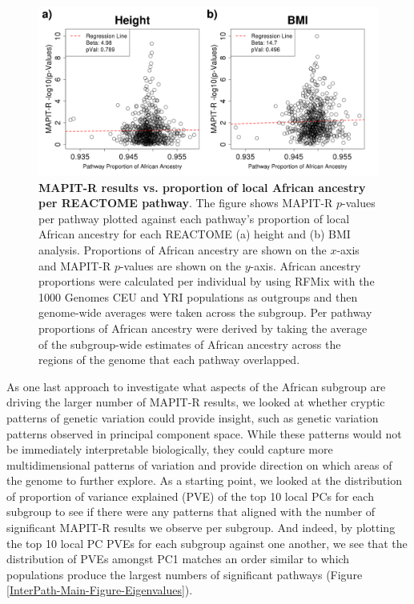 \documentclass[12pt,a4paper]{article}
\begin{document}
\begin{figure}[htb]
\centering
\includegraphics[scale=.35]{Images/Main/InterPath_Main_Figure_RFMix_vs2_African_REACTOME_noHLA.png}
\caption[TBD]{\textbf{MAPIT-R results vs. proportion of local African ancestry per REACTOME pathway}. The figure shows MAPIT-R $p$-values per pathway plotted against each pathway's proportion of local African ancestry for each REACTOME (a) height and (b) BMI analysis. Proportions of African ancestry are shown on the $x$-axis and MAPIT-R $p$-values are shown on the $y$-axis. African ancestry proportions were calculated per individual by using RFMix with the 1000 Genomes CEU and YRI populations as outgroups and then genome-wide averages were taken across the subgroup. Per pathway proportions of African ancestry were derived by taking the average of the subgroup-wide estimates of African ancestry across the regions of the genome that each pathway overlapped.}
\label{InterPath-Main-Figure-RFMix-African-REACTOME}
\end{figure}

As one last approach to investigate what aspects of the African subgroup are driving the larger number of MAPIT-R results, we looked at whether cryptic patterns of genetic variation could provide insight, such as genetic variation patterns observed in principal component space. While these patterns would not be immediately interpretable biologically, they could capture more multidimensional patterns of variation and provide direction on which areas of the genome to further explore. As a starting point, we looked at the distribution of proportion of variance explained (PVE) of the top 10 local PCs for each subgroup to see if there were any patterns that aligned with the number of significant MAPIT-R results we observe per subgroup. And indeed, by plotting the top 10 local PC PVEs for each subgroup against one another, we see that the distribution of PVEs amongst PC1 matches an order similar to which populations produce the largest numbers of significant pathways (Figure \ref{InterPath-Main-Figure-Eigenvalues}).   
\end{document}
